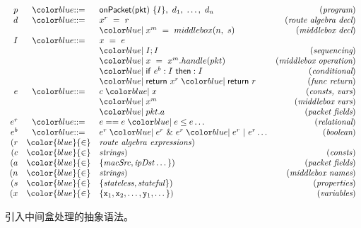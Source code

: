 \begin{figure}[ht]
{\small
\[%
\begin{array}{rclr}
p &\bnfdef & \ONPKT\ \{I\},\ d_1,\ \ldots,\ d_n &(\textit{program})\\
d &\bnfdef & x^r\ =\ r\  & (\textit{route algebra decl})\\
 & & \bnfalt x^m\ =\ middlebox(n,\ s) & (\textit{middlebox decl})\\
I &\bnfdef & x\ =\ e & \\
 & & \bnfalt I;I &  (\textit{sequencing})\\
 & & \bnfalt x\ =\ x^m.handle(pkt) &  (\textit{middlebox operation})\\
 & & \bnfalt \ifelse{e^b}{I}{I} &  (\textit{conditional})\\ %
 & & \bnfalt \return{x^r} \bnfalt \return{r} &  (\textit{func return})\\ 
e &\bnfdef & c \bnfalt x &  (\textit{consts, vars})\\
& & \bnfalt x^m & (\textit{middlebox vars}) \\
& & \bnfalt pkt.a & (\textit{packet fields}) \\
e^r & \bnfdef & e == e \bnfalt e \leq e \dots & (\textit{relational})\\
e^b & \bnfdef & e^r \bnfalt e^r\ \&\ e^r \bnfalt e^r\ |\ e^r \dots & (\textit{boolean})\\
(r &{\color{blue}{\in}}&\mathit{route\ algebra\ expressions}) & \\
(c &{\color{blue}{\in}}& \mathit{strings}) & (\mathit{consts})\\
(a &{\color{blue}{\in}}& \{ \mathit{macSrc}, \mathit{ipDst} \dots \}) & (\textit{packet fields})\\
(n &{\color{blue}{\in}}& \mathit{strings})  &  (\textit{middlebox names})\\
(s &{\color{blue}{\in}}& \{ \mathit{stateless},\mathit{stateful} \})  &  (\textit{properties})\\
(x &{\color{blue}{\in}} & \{\tx_1,\tx_2,\dots,\ty_1,\dots\}) &  (\textit{variables})\\
\end{array}\]}%
\caption{引入中间盒处理的抽象语法。}
\label{fig:grammar2}
\end{figure}

